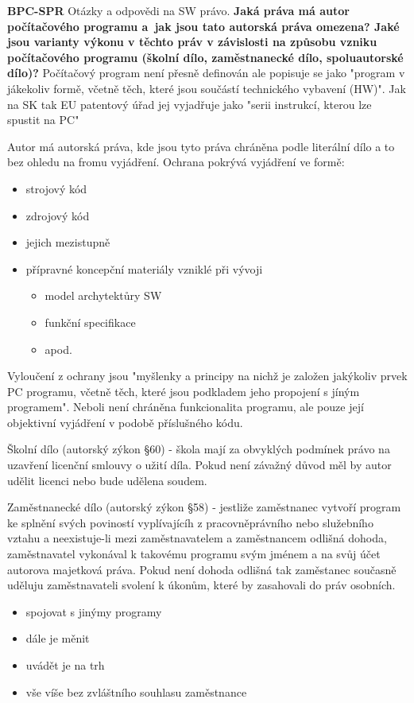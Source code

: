 \documentclass[12pt,a4paper,czech]{report}
\newcommand{\nadpis}[1]{\noindent\textbf{\Large{#1}}\normalsize}
\newcommand{\nadpisM}[1]{\noindent\textbf{\Huge{#1}}\normalsize}
\begin{document}
\nadpisM{BPC-SPR}\newline
\newline
\newline
Otázky a odpovědi na SW právo.
\newline
\newline
\newline
\nadpis{Jaká práva má autor počítačového programu a~jak jsou tato autorská práva omezena? Jaké jsou varianty výkonu v těchto práv v závislosti na způsobu vzniku počítačového programu (školní dílo, zaměstnanecké dílo, spoluautorské dílo)?}
\newline
\newline
Počítačový program není přesně definován ale popisuje se jako "program v jákekoliv formě, včetně těch, které jsou součástí technického vybavení (HW)". Jak na SK tak EU patentový úřad jej vyjadřuje jako "serii instrukcí, kterou lze spustit na PC"

Autor má autorská práva, kde jsou tyto práva chráněna podle literální dílo a to bez ohledu na fromu vyjádření. \newline
Ochrana pokrývá vyjádření ve formě:
\begin{itemize}
    \item strojový kód
    \item zdrojový kód
    \item jejich mezistupně
    \item přípravné koncepční materiály vzniklé při vývoji
    \begin{itemize}
        \item model archytektůry SW
        \item funkční specifikace
        \item apod.
    \end{itemize}
\end{itemize}
Vyloučení z ochrany jsou "myšlenky a principy na nichž je založen jakýkoliv prvek PC programu, včetně těch, které jsou podkladem jeho propojení s jíným programem". Neboli není chráněna funkcionalita programu, ale pouze její objektivní vyjádření v podobě příslušného kódu.


Školní dílo (autorský zýkon §60) - škola mají za obvyklých podmínek právo na uzavření licenční smlouvy o užití díla. Pokud není závažný důvod měl by autor udělit licenci nebo bude udělena soudem.

Zaměstnanecké dílo (autorský zýkon §58) - jestliže zaměstnanec vytvoří program ke splnění svých poviností vyplívajícíh z pracovněprávního nebo služebního vztahu a neexistuje-li mezi zaměstnavatelem a zaměstnancem odlišná dohoda, zaměstnavatel vykonával k takovému programu svým jménem a na svůj účet autorova majetková práva. Pokud není dohoda odlišná tak zaměstanec současně uděluju zaměstnavateli svolení k úkonům, které by zasahovali do práv osobních.
\begin{itemize}
    \item spojovat s jinýmy programy
    \item dále je měnit 
    \item uvádět je na trh
    \item vše víše bez zvláštního souhlasu zaměstnance
\end{itemize}
\end{document}
